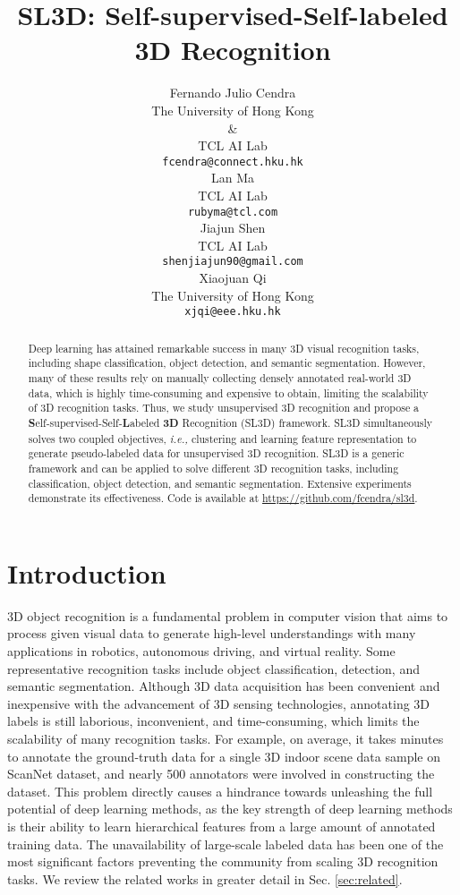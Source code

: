 \documentclass{article}
\title{SL3D: Self-supervised-Self-labeled 3D Recognition}
\author{Fernando Julio Cendra\\
  The University of Hong Kong\\
  \& \\
  TCL AI Lab\\
  \texttt{fcendra@connect.hku.hk}\\
  \And
  Lan Ma\\
  TCL AI Lab\\
  \texttt{rubyma@tcl.com}\\
  \AND
  Jiajun Shen\\
  TCL AI Lab\\
  \texttt{shenjiajun90@gmail.com}\\
  \And
  Xiaojuan Qi\\
  The University of Hong Kong\\
  \texttt{xjqi@eee.hku.hk}\\
}
\begin{document}
\maketitle

\begin{abstract}
Deep learning has attained remarkable success in many 3D visual recognition tasks, including shape classification, object detection, and semantic segmentation.
  However, many of these results rely on manually collecting densely annotated real-world 3D data, which is highly time-consuming and expensive to obtain, limiting the scalability of 3D recognition tasks. Thus, we study unsupervised 3D recognition and propose a \textbf{S}elf-supervised-Self-\textbf{L}abeled \textbf{3D} Recognition (SL3D) framework. SL3D simultaneously solves two coupled objectives, \emph{i.e.,} clustering  and learning feature representation to generate pseudo-labeled data for unsupervised 3D recognition. SL3D is a generic framework and can be applied to solve different 3D recognition tasks, including classification, object detection, and semantic segmentation. Extensive experiments demonstrate its effectiveness. Code is available at \url{https://github.com/fcendra/sl3d}.
\end{abstract}

\section{Introduction}

3D object recognition is a fundamental problem in computer vision that aims to process given visual data to generate high-level understandings with many applications in robotics, autonomous driving, and virtual reality. Some representative recognition tasks include object classification, detection, and semantic segmentation. Although 3D data acquisition has been convenient and inexpensive with the advancement of 3D sensing technologies, annotating 3D labels is still laborious, inconvenient, and time-consuming, which limits the scalability of many recognition tasks. For example, on average, it takes  minutes to annotate the ground-truth data for a single 3D indoor scene data sample on ScanNet \cite{dai2017scannet} dataset, and nearly 500 annotators were involved in constructing the dataset. This problem directly causes a hindrance towards unleashing the full potential of deep learning methods, as the key strength of deep learning methods is their ability to learn hierarchical features from a large amount of annotated training data. 
The unavailability of large-scale labeled data has been one of the most significant factors preventing the community from scaling 3D recognition tasks. We review the related works in greater detail in Sec. \ref{sec:related}.
\end{document}
